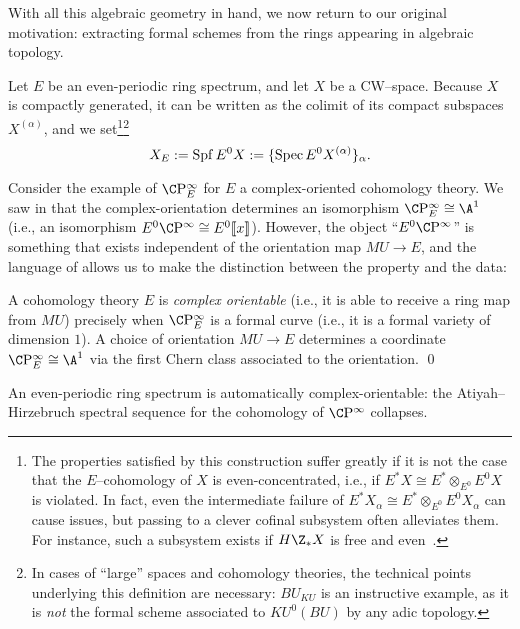 With all this algebraic geometry in hand, we now return to our original motivation: extracting formal schemes from the rings appearing in algebraic topology.

\begin{definition}\label{FullDefnOfXE}
Let \(E\) be an even-periodic ring spectrum, and let \(X\) be a CW--space.  Because \(X\) is compactly generated, it can be written as the colimit of its compact subspaces \(X^{(\alpha)}\), and we set\footnote{The properties satisfied by this construction suffer greatly if it is not the case that the \(E\)--cohomology of \(X\) is even-concentrated, i.e., if \(E^* X \cong E^* \otimes_{E^0} E^0 X\) is violated.  In fact, even the intermediate failure of \(E^* X_\alpha \cong E^* \otimes_{E^0} E^0 X_\alpha\) can cause issues, but passing to a clever cofinal subsystem often alleviates them.  For instance, such a subsystem exists if \(H\Z_* X\) is free and even~\cite[Definition 8.15, Proposition 8.17]{StricklandFSFG}.}\footnote{In cases of ``large'' spaces and cohomology theories, the technical points underlying this definition are necessary: \(BU_{KU}\) is an instructive example, as it is \emph{not} the formal scheme associated to \(KU^0(BU)\) by any adic topology.} \[X_E := \operatorname{Spf} E^0 X := \{\operatorname{Spec} E^0 X^{(\alpha)}\}_\alpha.\]
\end{definition}

Consider the example of \(\CP^\infty_E\) for \(E\) a complex-oriented cohomology theory.  We saw in  that the complex-orientation determines an isomorphism \(\CP^\infty_E \cong \A^1\) (i.e., an isomorphism \(E^0 \CP^\infty \cong E^0\ps{x}\)).  However, the object ``\(E^0 \CP^\infty\)'' is something that exists independent of the orientation map \(MU \to E\), and the language of  allows us to make the distinction between the property and the data:
\begin{lemma}
A cohomology theory \(E\) is \textit{complex orientable} (i.e., it is able to receive a ring map from \(MU\)) precisely when \(\CP^\infty_E\) is a formal curve (i.e., it is a formal variety of dimension \(1\)).  A choice of orientation \(MU \to E\) determines a coordinate \(\CP^\infty_E \cong \A^1\) via the first Chern class associated to the orientation. \qed
\end{lemma}

\begin{remark}\label{EvenPeriodicImplicesCplxO}
An even-periodic ring spectrum is automatically complex-orientable: the Atiyah--Hirzebruch spectral sequence for the cohomology of \(\CP^\infty\) collapses.
\end{remark}

